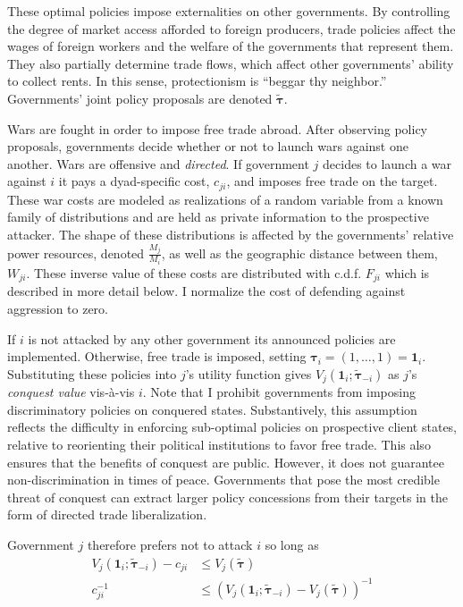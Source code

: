 \documentclass{puthesis}
\begin{document}
These optimal policies impose externalities on other governments. By
controlling the degree of market access afforded to foreign producers,
trade policies affect the wages of foreign workers and the welfare of
the governments that represent them. They also partially determine trade
flows, which affect other governments' ability to collect rents. In this
sense, protectionism is ``beggar thy neighbor.'' Governments' joint
policy proposals are denoted \(\tilde{\bm{\tau}}\).

Wars are fought in order to impose free trade abroad. After observing
policy proposals, governments decide whether or not to launch wars
against one another. Wars are offensive and \emph{directed}. If
government \(j\) decides to launch a war against \(i\) it pays a
dyad-specific cost, \(c_{ji}\), and imposes free trade on the target.
These war costs are modeled as realizations of a random variable from a
known family of distributions and are held as private information to the
prospective attacker. The shape of these distributions is affected by
the governments' relative power resources, denoted \(\frac{M_j}{M_i}\),
as well as the geographic distance between them, \(W_{ji}\). These
inverse value of these costs are distributed with c.d.f. \(F_{ji}\)
which is described in more detail below. I normalize the cost of
defending against aggression to zero.

If \(i\) is not attacked by any other government its announced policies
are implemented. Otherwise, free trade is imposed, setting
\(\bm{\tau}_i = \left( 1, \dots, 1 \right) = \bm{1}_i\). Substituting
these policies into \(j\)'s utility function gives
\(V_j(\bm{1}_i; \tilde{\bm{\tau}}_{-i})\) as \(j\)'s \emph{conquest
value} vis-à-vis \(i\). Note that I prohibit governments from imposing
discriminatory policies on conquered states. Substantively, this
assumption reflects the difficulty in enforcing sub-optimal policies on
prospective client states, relative to reorienting their political
institutions to favor free trade. This also ensures that the benefits of
conquest are public. However, it does not guarantee non-discrimination
in times of peace. Governments that pose the most credible threat of
conquest can extract larger policy concessions from their targets in the
form of directed trade liberalization.

Government \(j\) therefore prefers not to attack \(i\) so long as
\begin{align*}
V_j \left( \bm{1}_i; \tilde{\bm{\tau}}_{-i} \right) - c_{ji} &\leq V_j \left( \tilde{\bm{\tau}} \right) \\
c_{ji}^{-1} &\leq \left( V_j \left( \bm{1}_i; \tilde{\bm{\tau}}_{-i} \right) - V_j \left( \tilde{\bm{\tau}} \right) \right)^{-1}
\end{align*}
\end{document}
